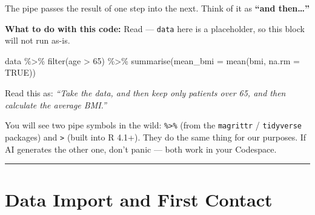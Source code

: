 \documentclass[
  letterpaper,
  DIV=11,
  numbers=noendperiod,
  oneside]{scrreprt}
\newenvironment{Shaded}{\begin{snugshade}}{\end{snugshade}}
\newcommand{\AttributeTok}[1]{\textcolor[rgb]{0.40,0.45,0.13}{#1}}
\newcommand{\ConstantTok}[1]{\textcolor[rgb]{0.56,0.35,0.01}{#1}}
\newcommand{\DecValTok}[1]{\textcolor[rgb]{0.68,0.00,0.00}{#1}}
\newcommand{\FunctionTok}[1]{\textcolor[rgb]{0.28,0.35,0.67}{#1}}
\newcommand{\NormalTok}[1]{\textcolor[rgb]{0.00,0.23,0.31}{#1}}
\newcommand{\SpecialCharTok}[1]{\textcolor[rgb]{0.37,0.37,0.37}{#1}}
\begin{document}
The pipe passes the result of one step into the next. Think of it as
\textbf{``and then\ldots{}''}

\textbf{What to do with this code:} Read --- \texttt{data} here is a
placeholder, so this block will not run as-is.

\begin{Shaded}
\begin{Highlighting}[numbers=left,,]
\NormalTok{data }\SpecialCharTok{\%\textgreater{}\%}
  \FunctionTok{filter}\NormalTok{(age }\SpecialCharTok{\textgreater{}} \DecValTok{65}\NormalTok{) }\SpecialCharTok{\%\textgreater{}\%}
  \FunctionTok{summarise}\NormalTok{(}\AttributeTok{mean\_bmi =} \FunctionTok{mean}\NormalTok{(bmi, }\AttributeTok{na.rm =} \ConstantTok{TRUE}\NormalTok{))}
\end{Highlighting}
\end{Shaded}

Read this as: \emph{``Take the data, and then keep only patients over
65, and then calculate the average BMI.''}

\begin{tcolorbox}[enhanced jigsaw, title=\textcolor{quarto-callout-tip-color}{\faLightbulb}\hspace{0.5em}{Tip}, arc=.35mm, toptitle=1mm, colframe=quarto-callout-tip-color-frame, toprule=.15mm, leftrule=.75mm, bottomtitle=1mm, opacityback=0, bottomrule=.15mm, coltitle=black, breakable, opacitybacktitle=0.6, titlerule=0mm, colback=white, left=2mm, colbacktitle=quarto-callout-tip-color!10!white, rightrule=.15mm]

You will see two pipe symbols in the wild: \texttt{\%\textgreater{}\%}
(from the \texttt{magrittr} / \texttt{tidyverse} packages) and
\texttt{\textbar{}\textgreater{}} (built into R 4.1+). They do the same
thing for our purposes. If AI generates the other one, don't panic ---
both work in your Codespace.

\end{tcolorbox}

\begin{center}\rule{0.5\linewidth}{0.5pt}\end{center}

\section*{Data Import and First
Contact}\label{data-import-and-first-contact}

\end{document}
